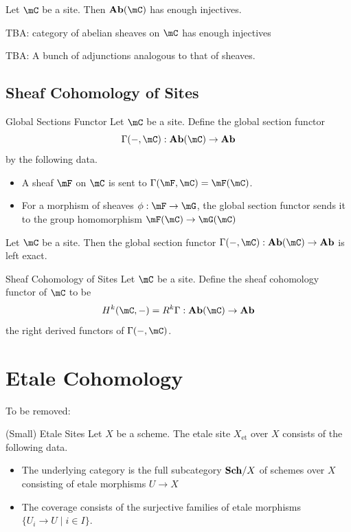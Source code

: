 \documentclass[a4paper]{article}
\begin{document}
\begin{thm}{}{} Let $\mC$ be a site. Then $\bold{Ab}(\mC)$ has enough injectives. 
\end{thm}

TBA: category of abelian sheaves on $\mC$ has enough injectives

TBA: A bunch of adjunctions analogous to that of sheaves. 

\subsection{Sheaf Cohomology of Sites}
\begin{defn}{Global Sections Functor}{} Let $\mC$ be a site. Define the global section functor $$\Gamma(-,\mC):\bold{Ab}(\mC)\to\bold{Ab}$$ by the following data. 
\begin{itemize}
\item A sheaf $\mF$ on $\mC$ is sent to $\Gamma(\mF,\mC)=\mF(\mC)$. 
\item For a morphism of sheaves $\phi:\mF\to\mG$, the global section functor sends it to the group homomorphism $\mF(\mC)\to\mG(\mC)$
\end{itemize}
\end{defn}

\begin{prp}{}{} Let $\mC$ be a site. Then the global section functor $\Gamma(-,\mC):\bold{Ab}(\mC)\to\bold{Ab}$ is left exact. 
\end{prp}

\begin{defn}{Sheaf Cohomology of Sites}{} Let $\mC$ be a site. Define the sheaf cohomology functor of $\mC$ to be $$H^k(\mC,-)=R^k\Gamma:\bold{Ab}(\mC)\to\bold{Ab}$$ the right derived functors of $\Gamma(-,\mC)$. 
\end{defn}

\pagebreak
\section{Etale Cohomology}
To be removed: 

\begin{defn}{(Small) Etale Sites}{} Let $X$ be a scheme. The etale site $X_\text{et}$ over $X$ consists of the following data. 
\begin{itemize}
\item The underlying category is the full subcategory $\bold{Sch}/X$ of schemes over $X$ consisting of etale morphisms $U\to X$
\item The coverage consists of the surjective families of etale morphisms $\{U_i\to U\;|\;i\in I\}$. 
\end{itemize}
\end{defn}
\end{document}
